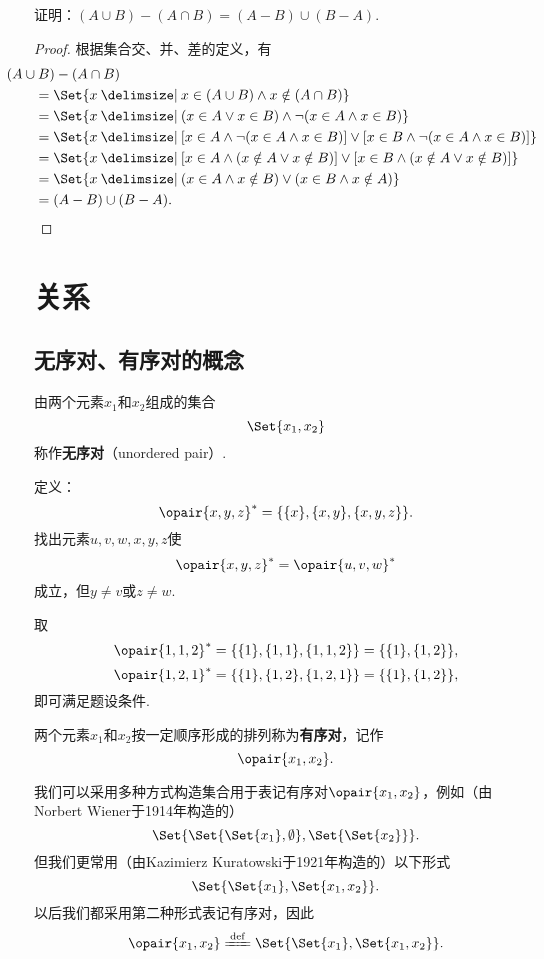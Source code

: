 \begin{example}
证明：\((A \cup B) - (A \cap B) = (A-B)\cup(B-A)\).
\begin{proof}
根据集合交、并、差的定义，有
\begin{align*}
&\hspace{-20pt}
(A \cup B) - (A \cap B) \\
&= \Set{ x \given x \in (A \cup B) \land x \notin (A \cap B) } \\
&= \Set{ x \given (x \in A \lor x \in B) \land \neg(x \in A \land x \in B) } \\
&= \Set{ x \given [x \in A \land \neg(x \in A \land x \in B)]
 \lor [x \in B \land \neg(x \in A \land x \in B)] } \\
&= \Set{ x \given [x \in A \land (x \notin A \lor x \notin B)]
 \lor [x \in B \land (x \notin A \lor x \notin B)] } \\
&= \Set{ x \given (x \in A \land x \notin B) \lor (x \in B \land x \notin A) } \\
&= (A-B)\cup(B-A).
\qedhere
\end{align*}
\end{proof}
\end{example}

\section{关系}
\subsection{无序对、有序对的概念}
\begin{definition}[无序对]
由两个元素\(x_1\)和\(x_2\)组成的集合\[
\Set{x_1, x_2}
\]称作\textbf{无序对}（unordered pair）.
\end{definition}

\begin{example}
定义：\[
\opair{x,y,z}^* = \{\{x\},\{x,y\},\{x,y,z\}\}.
\]找出元素\(u,v,w,x,y,z\)使\[
\opair{x,y,z}^* = \opair{u,v,w}^*
\]成立，但\(y \neq v\)或\(z \neq w\).
\begin{solution}
取\[
\opair{1,1,2}^* = \{\{1\},\{1,1\},\{1,1,2\}\} = \{\{1\},\{1,2\}\},
\]\[
\opair{1,2,1}^* = \{\{1\},\{1,2\},\{1,2,1\}\} = \{\{1\},\{1,2\}\},
\]即可满足题设条件.
\end{solution}
\end{example}

\begin{definition}[有序对]
两个元素\(x_1\)和\(x_2\)按一定顺序形成的排列称为\textbf{有序对}，记作\[
\opair{x_1,x_2}.
\]

我们可以采用多种方式构造集合用于表记有序对\(\opair{x_1,x_2}\)，例如（由Norbert Wiener于1914年构造的）
\[
\Set{ \Set{ \Set{x_1}, \emptyset }, \Set{ \Set{ x_2 } } }.
\]
但我们更常用（由Kazimierz Kuratowski于1921年构造的）以下形式
\[
\Set{ \Set{x_1}, \Set{x_1, x_2} }.
\]以后我们都采用第二种形式表记有序对，因此\[
\opair{x_1,x_2}
\defeq
\Set{ \Set{x_1}, \Set{x_1, x_2} }.
\]
\end{definition}


